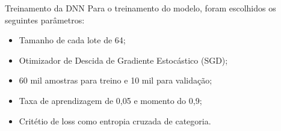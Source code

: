 \begin{frame}{Treinamento da DNN}
    Para o treinamento do modelo, foram escolhidos os seguintes parâmetros:
    \begin{itemize}
        \item Tamanho de cada lote de 64;
        \item Otimizador de Descida de Gradiente Estocástico (SGD);
        \item 60 mil amostras para treino e 10 mil para validação;
        \item Taxa de aprendizagem de 0,05 e momento do 0,9;
        \item Critétio de loss como entropia cruzada de categoria.
    \end{itemize}
\end{frame}

